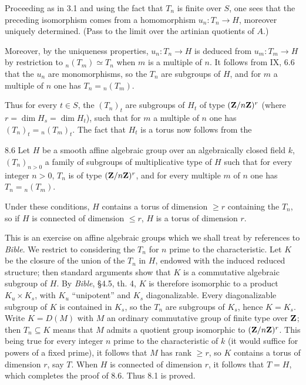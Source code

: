 Proceeding as in 3.1 and using the fact that $T_n$ is finite over $S$, one sees that the preceding isomorphism comes from a homomorphism $u_n:T_n\to H$, moreover uniquely determined. (Pass to the limit over the artinian quotients of $A$.)

Moreover, by the uniqueness properties, $u_n:T_n\to H$ is deduced from $u_m:T_m\to H$ by restriction to ${}_n(T_m)\simeq T_n$ when $m$ is a multiple of $n$. It follows from IX, 6.6 that the $u_n$ are monomorphisms, so the $T_n$ are subgroups of $H$, and for $m$ a multiple of $n$ one has $T_n={}_n(T_m)$.

Thus for every $t\in S$, the $(T_n)_t$ are subgroups of $H_t$ of type $(\mathbf{Z}/n\mathbf{Z})^r$ (where $r=\dim H_s=\dim H_t$), such that for $m$ a multiple of $n$ one has $(T_n)_t={}_n(T_m)_t$. The fact that $H_t$ is a torus now follows from the
\begin{lemma}{8.6}\label{X.8.6}
Let $H$ be a smooth affine algebraic group over an algebraically closed field $k$, $(T_n)_{n>0}$ a family of subgroups of multiplicative type of $H$ such that for every integer $n>0$, $T_n$ is of type $(\mathbf{Z}/n\mathbf{Z})^r$, and for every multiple $m$ of $n$ one has $T_n={}_n(T_m)$.

Under these conditions, $H$ contains a torus of dimension $\geq r$ containing the $T_n$, so if $H$ is connected of dimension $\leq r$, $H$ is a torus of dimension $r$.
\end{lemma}
This is an exercise on affine algebraic groups which we shall treat by references to \emph{Bible}. We restrict to considering the $T_n$ for $n$ prime to the characteristic. Let $K$ be the closure of the union of the $T_n$ in $H$, endowed with the induced reduced structure; then standard arguments show that $K$ is a commutative algebraic subgroup of $H$. By \emph{Bible}, \S4.5, th. 4, $K$ is therefore isomorphic to a product $K_u\times K_s$, with $K_u$ ``unipotent'' and $K_s$ diagonalizable. Every diagonalizable subgroup of $K$ is contained in $K_s$, so the $T_n$ are subgroups of $K_s$, hence $K=K_s$. Write $K=D(M)$ with $M$ an ordinary commutative group of finite type over $\mathbf{Z}$; then $T_n\subseteq K$ means that $M$ admits a quotient group isomorphic to $(\mathbf{Z}/n\mathbf{Z})^r$. This being true for every integer $n$ prime to the characteristic of $k$ (it would suffice for powers of a fixed prime), it follows that $M$ has rank $\geq r$, so $K$ contains a torus of dimension $r$, say $T$. When $H$ is connected of dimension $r$, it follows that $T=H$, which completes the proof of 8.6. Thus 8.1 is proved.
